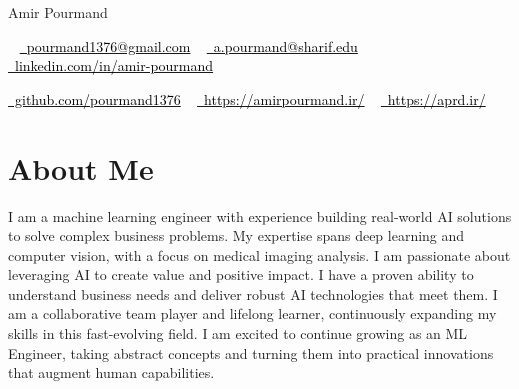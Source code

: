 \documentclass[letterpaper,11pt]{article}
\begin{document}

\begin{center}
    {\Huge 
     Amir Pourmand} \\ \vspace{5pt}

   
  
   
    ~ 
 \href{mailto:pourmand1376@gmail.com}{ 
 	\textcolor{black}{
 	\raisebox{-0.2\height}\faEnvelope\  pourmand1376@gmail.com}}
~ 
 \href{mailto:a.pourmand@sharif.edu}
 {
 	\textcolor{black}{
 	\raisebox{-0.2\height}\faEnvelope\  a.pourmand@sharif.edu}}
\vspace{3pt}
 ~ 
    \href{https://linkedin.com/in/amir-pourmand/}
    { \textcolor{black}{
\raisebox{-0.2\height}
    \faLinkedin\ linkedin.com/in/amir-pourmand}}
    ~
    
    
    \href{https://github.com/pourmand1376}{\textcolor{black}{
    \raisebox{-0.2\height}
    \faGithub\ github.com/pourmand1376}}
    \vspace{-8pt}
    ~ 
    \href{https://amirpourmand.ir/}{
    	\textcolor{black}{
    	\raisebox{-0.2\height}\faGlobe\ https://amirpourmand.ir/}}
    ~ \href{https://aprd.ir/}{
    	\textcolor{black}{
    		\raisebox{-0.2\height}\faGlobe\ https://aprd.ir/}}
    
    \vspace{-8pt}
\end{center}

\vspace{1pt}
\section{About Me}

I am a machine learning engineer with experience building real-world AI solutions to solve complex business problems. 
My expertise spans deep learning and computer vision, with a focus on medical imaging analysis. 
I am passionate about leveraging AI to create value and positive impact. 
I have a proven ability to understand business needs and deliver robust AI technologies that meet them. 
I am a collaborative team player and lifelong learner, continuously expanding my skills in this fast-evolving field. 
I am excited to continue growing as an ML Engineer, taking abstract concepts and turning them into practical innovations that augment human capabilities.
\end{document}
